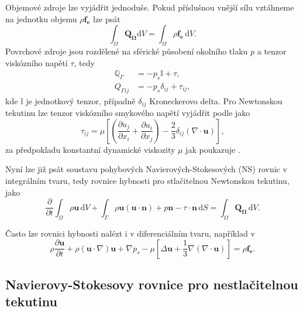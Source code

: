 Objemové zdroje lze vyjádřit jednoduše. Pokud příslušnou vnější sílu vztáhneme na jednotku objemu $\rho \mathbf{f_e}$ lze psát
\begin{equation}
\int_{\Omega} \mathbf{Q_\Omega} \mathrm{d}V = \int_{\Omega} \rho \mathbf{f_e} \,\mathrm{d}V.
\end{equation}
Povrchové zdroje jsou rozdělené na sférické působení okolního tlaku $p$ a tenzor viskózního napětí $\tau$, tedy
\begin{align*}
\mathbb{Q}_\Gamma &= -p_s \mathbb{I}+\tau, \\
Q_{\Gamma ij}&= -p_s \delta_{ij}+\tau_{ij},
\end{align*}
kde $\mathbb{I}$ je jednotkový tenzor, případně $\delta_{ij}$ Kroneckerovo delta. Pro Newtonskou tekutinu lze tenzor viskózního smykového napětí vyjádřit podle \cite{hirsch2007numerical} jako 
\begin{equation}
\tau_{ij}=\mu \left[ \left( \dfrac{\partial u_j}{\partial x_i} + \dfrac{\partial u_i}{\partial x_j} \right) - \dfrac{2}{3} \delta_{ij} \left(\nabla \cdot \mathbf{u}\right)  \right],
\end{equation}
za předpokladu konstantní dynamické viskozity $\mu$ jak poukazuje \cite{dvorak1987vnitrniaerodynamika}.

Nyní lze již psát soustavu pohybových Navierových-Stokesových (NS) rovnic v integrálním tvaru, tedy rovnice hybnosti pro stlačitelnou Newtonskou tekutinu, jako
\begin{equation}
\dfrac{\partial}{\partial t} \int_{\Omega} \rho \mathbf{u} \,\mathrm{d}V + \int_{\Gamma} \rho \mathbf{u} (\mathbf{u}\cdot \mathbf{n}) + p\mathbf{n} - \tau \cdot \mathbf{n} \,\mathrm{d}S = \int_\Omega \mathbf{Q_\Omega} \,\mathrm{d}V.
\end{equation}

Často lze rovnici hybnosti nalézt i v diferenciálním tvaru, například v \cite{hirsch2007numerical}
\begin{equation}
\rho \dfrac{\partial \mathbf{u}}{\partial t} + \rho (\mathbf{u} \cdot \nabla)\mathbf{u} +\nabla p_s - \mu \left[ \Delta \mathbf{u} + \dfrac{1}{3} \nabla(\nabla \cdot \mathbf{u}) \right] = \rho \mathbf{f_e}.
\end{equation}

\subsection{Navierovy-Stokesovy rovnice pro nestlačitelnou tekutinu}

